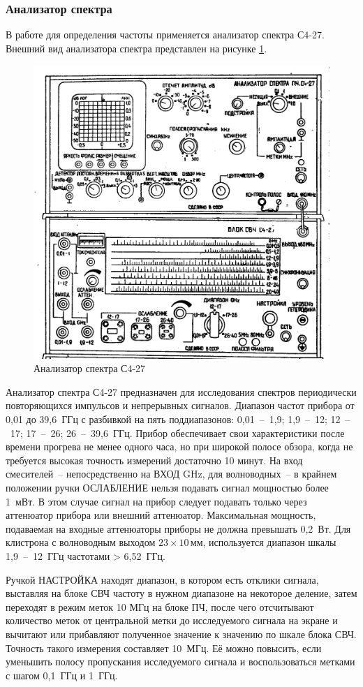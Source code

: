 \documentclass[a4paper,14pt]{extarticle}
\begin{document}
	\subsubsection{Анализатор спектра}
	
	В работе для определения частоты применяется анализатор спектра С4-27. Внешний вид анализатора спектра представлен на рисунке \ref{figa}.

    \begin{figure}[!h]
        \center
        \includegraphics[width = .5\textwidth]{images/s4-27.png}
        \caption{Анализатор спектра С4-27}
        \label{figa}
    \end{figure}

	Анализатор спектра С4-27 предназначен для исследования спектров периодически повторяющихся импульсов и непрерывных сигналов. Диапазон частот прибора от 0,01 до 39,6~ГГц с разбивкой на пять поддиапазонов: 0,01~--~1,9; 1,9~--~12; 12~--~17; 17~--~26; 26~--~39,6~ГГц. Прибор обеспечивает свои характеристики после времени прогрева не менее одного часа, но при широкой полосе обзора, когда не требуется высокая точность измерений достаточно 10 минут. На вход смесителей~-- непосредственно на ВХОД GHz, для волноводных~-- в крайнем положении ручки ОСЛАБЛЕНИЕ нельзя подавать сигнал мощностью более 1~мВт. В этом случае сигнал на прибор следует подавать только через аттенюатор прибора или внешний аттенюатор. Максимальная мощность, подаваемая на входные аттенюаторы приборы не должна превышать 0,2~Вт. Для клистрона с волноводным выходом $23\times10\,$мм, используется диапазон шкалы 1,9~--~12~ГГц частотами > 6,52~ГГц.  
	
	Ручкой НАСТРОЙКА находят диапазон, в котором есть отклики сигнала, выставляя на блоке СВЧ частоту в нужном диапазоне на некоторое деление, затем переходят в режим меток 10 МГц на блоке ПЧ, после чего отсчитывают количество меток от центральной метки до исследуемого сигнала на экране и вычитают или прибавляют полученное значение к значению по шкале блока СВЧ. Точность такого измерения составляет 10~МГц. Её можно повысить, если уменьшить полосу пропускания исследуемого сигнала и воспользоваться метками с шагом 0,1~ГГц и 1~ГГц.
\end{document}
